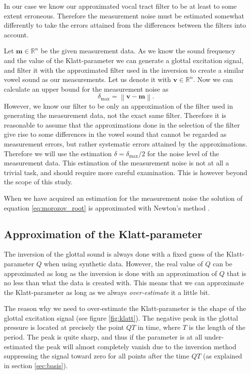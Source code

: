 \documentclass[12pt,a4]{article}
\newcommand{\R}{{\mathbb R}}
\newcommand{\lnorm}{\left\|}
\newcommand{\rnorm}{\right\|}
\newcommand{\vc}[1]{\ensuremath{\bm{#1}}}
\begin{document}
In our case we know our approximated vocal tract filter to be at least to some extent erroneous. Therefore the measurement noise must be estimated somewhat differently to take the errors attained from the differences between the filters into account.

Let $\vc{m} \in \R^n$ be the given measurement data. As we know the sound frequency and the value of the Klatt-parameter we can generate a glottal excitation signal, and filter it with the approximated filter used in the inversion to create a similar vowel sound as our measurements. Let us denote it with $\vc{v} \in \R^n$. Now we can calculate an upper bound for the measurement noise as
\begin{equation}
\delta_{\text{max}} = \lnorm \vc{v} - \vc{m} \rnorm .
\end{equation}
However, we know our filter to be only an approximation of the filter used in generating the measurement data, not the exact same filter. Therefore it is reasonable to assume that the approximations done in the selection of the filter give rise to some differences in the vowel sound that cannot be regarded as measurement errors, but rather systematic errors attained by the approximations. Therefore we will use the estimation $\delta = \delta_{\text{max}} / 2$ for the noise level of the measurement data. This estimation of the measurement noise is not at all a trivial task, and should require more careful examination. This is however beyond the scope of this study.
 
When we have acquired an estimation for the measurement noise the solution of equation \eqref{eq:morozov_root} is approximated with Newton's method \cite{NR}.


\subsection{Approximation of the Klatt-parameter}
\label{sec:approxKlatt}

The inversion of the glottal sound is always done with a fixed guess of the Klatt-parameter $Q$ when using synthetic data. However, the real value of $Q$ can be approximated as long as the inversion is done with an approximation of $Q$ that is no less than what the data is created with. This means that we can approximate the Klatt-parameter as long as we always \emph{over-estimate} it a little bit.

The reason why we need to over-estimate the Klatt-parameter is the shape of the glottal excitation signal (see figure \ref{fig:klatt}). The negative peak in the glottal pressure is located at precisely the point $QT$ in time, where $T$ is the length of the period. The peak is quite sharp, and thus if the parameter is at all under-estimated the peak will almost completely vanish due to the inversion method suppressing the signal toward zero for all points after the time $QT$ (as explained in section \ref{sec:basis}).
\end{document}
